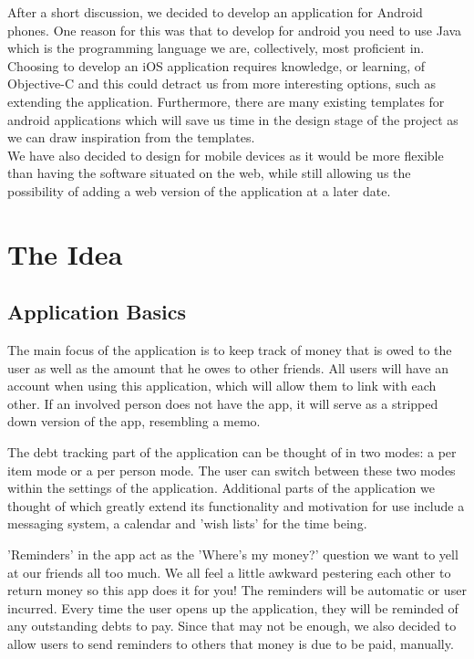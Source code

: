 \documentclass[a4paper,11pt]{article}
\begin{document}
After a short discussion, we decided to develop an application for Android phones. One reason for this was that to develop for android you need to use Java which is the programming language we are, collectively, most proficient in. Choosing to develop an iOS application requires knowledge, or learning, of Objective-C and this could detract us from more interesting options, such as extending the application. Furthermore, there are many existing templates for android applications which will save us time in the design stage of the project as we can draw inspiration from the templates. \\
We have also decided to design for mobile devices as it would be more flexible than having the software situated on the web, while still allowing us the possibility of adding a web version of the application at a later date.

\section*{The Idea}

\subsection*{Application Basics}
The main focus of the application is to keep track of money that is owed to the user as well as the amount that he owes to other friends. All users will have an account when using this application, which will allow them to link with each other. If an involved person does not have the app, it will serve as a stripped down version of the app, resembling a memo.

The debt tracking part of the application can be thought of in two modes: a per item mode or a per person mode. The user can switch between these two modes within the settings of the application.  
Additional parts of the application we thought of which greatly extend its functionality and motivation for use include a messaging system, a calendar and 'wish lists' for the time being. 

'Reminders' in the app act as the 'Where's my money?' question we want to yell at our friends all too much. We all feel a little awkward pestering each other to return money so this app does it for you!
The reminders will be automatic or user incurred. Every time the user opens up the application, they will be reminded of any outstanding debts to pay. Since that may not be enough, we also decided to allow users to send reminders to others that money is due to be paid, manually. 
\end{document}
